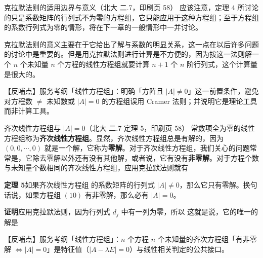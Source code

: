 \begin{fdeep}{克拉默法则的适用边界与意义（北大 二.7，印刷页 58）}
应该注意，定理 $4$ 所讨论的只是系数矩阵的行列式不为零的方程组，它只能应用于这种方程组；至于方程组的系数行列式为零的情形，将在下一章的一般情形中一并讨论。

克拉默法则的意义主要在于它给出了解与系数的明显关系，这一点在以后许多问题的讨论中是重要的。但是用克拉默法则进行计算是不方便的，因为按这一法则解一个 $n$ 个未知量 $n$ 个方程的线性方程组就要计算 $n+1$ 个 $n$ 阶行列式，这个计算量是很大的。

【反哺点】服务考纲「线性方程组」：明确「方阵且 $|A|\ne 0$」这一前置条件，避免对方程数 $\ne$ 未知数或 $|A|=0$ 的方程组误用 Cramer 法则；并说明它是理论工具而非计算工具。
\end{fdeep}

\begin{fdeep}{齐次线性方程组与 $|A|=0$（北大 二.7 定理 5，印刷页 58）}
常数项全为零的线性方程组称为\textbf{齐次线性方程组}。显然，齐次线性方程组总是有解的，因为 $(0,0,\cdots,0)$ 就是一个解，它称为\textbf{零解}。对于齐次线性方程组，我们关心的问题常常是，它除去零解以外还有没有其他解，或者说，它有没有\textbf{非零解}。对于方程个数与未知量个数相同的齐次线性方程组，应用克拉默法则就有

\textbf{定理 5}\quad 如果齐次线性方程组
的系数矩阵的行列式 $|A|\ne 0$，那么它只有零解。换句话说，如果方程组 $(10)$ 有非零解，那么必有 $|A|=0$。

\textbf{证明}\quad 应用克拉默法则，因为行列式 $d_j$ 中有一列为零，所以
这就是说，它的唯一的解是

【反哺点】服务考纲「线性方程组」：$n$ 个方程 $n$ 个未知量的齐次方程组「有非零解 $\Leftrightarrow |A|=0$」是特征值（$|A-\lambda E|=0$）与线性相关判定的公共接口。
\end{fdeep}